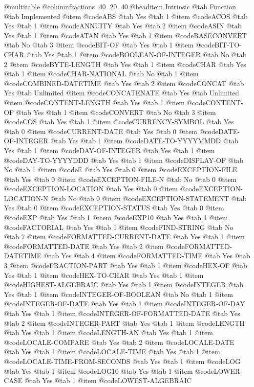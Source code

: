 @multitable @columnfractions .40 .20 .40
@headitem Intrinsic
@tab Function @tab Implemented
@item @code{ABS}
@tab Yes @tab 1
@item @code{ACOS}
@tab Yes @tab 1
@item @code{ANNUITY}
@tab Yes @tab 2
@item @code{ASIN}
@tab Yes @tab 1
@item @code{ATAN}
@tab Yes @tab 1
@item @code{BASECONVERT}
@tab No @tab 3
@item @code{BIT-OF}
@tab Yes @tab 1
@item @code{BIT-TO-CHAR}
@tab Yes @tab 1
@item @code{BOOLEAN-OF-INTEGER}
@tab No @tab 2
@item @code{BYTE-LENGTH}
@tab Yes @tab 1
@item @code{CHAR}
@tab Yes @tab 1
@item @code{CHAR-NATIONAL}
@tab No @tab 1
@item @code{COMBINED-DATETIME}
@tab Yes @tab 2
@item @code{CONCAT}
@tab Yes @tab Unlimited
@item @code{CONCATENATE}
@tab Yes @tab Unlimited
@item @code{CONTENT-LENGTH}
@tab Yes @tab 1
@item @code{CONTENT-OF}
@tab Yes @tab 1
@item @code{CONVERT}
@tab No @tab 3
@item @code{COS}
@tab Yes @tab 1
@item @code{CURRENCY-SYMBOL}
@tab Yes @tab 0
@item @code{CURRENT-DATE}
@tab Yes @tab 0
@item @code{DATE-OF-INTEGER}
@tab Yes @tab 1
@item @code{DATE-TO-YYYYMMDD}
@tab Yes @tab 1
@item @code{DAY-OF-INTEGER}
@tab Yes @tab 1
@item @code{DAY-TO-YYYYDDD}
@tab Yes @tab 1
@item @code{DISPLAY-OF}
@tab No @tab 1
@item @code{E}
@tab Yes @tab 0
@item @code{EXCEPTION-FILE}
@tab Yes @tab 0
@item @code{EXCEPTION-FILE-N}
@tab No @tab 0
@item @code{EXCEPTION-LOCATION}
@tab Yes @tab 0
@item @code{EXCEPTION-LOCATION-N}
@tab No @tab 0
@item @code{EXCEPTION-STATEMENT}
@tab Yes @tab 0
@item @code{EXCEPTION-STATUS}
@tab Yes @tab 0
@item @code{EXP}
@tab Yes @tab 1
@item @code{EXP10}
@tab Yes @tab 1
@item @code{FACTORIAL}
@tab Yes @tab 1
@item @code{FIND-STRING}
@tab No @tab 7
@item @code{FORMATTED-CURRENT-DATE}
@tab Yes @tab 1
@item @code{FORMATTED-DATE}
@tab Yes @tab 2
@item @code{FORMATTED-DATETIME}
@tab Yes @tab 4
@item @code{FORMATTED-TIME}
@tab Yes @tab 3
@item @code{FRACTION-PART}
@tab Yes @tab 1
@item @code{HEX-OF}
@tab Yes @tab 1
@item @code{HEX-TO-CHAR}
@tab Yes @tab 1
@item @code{HIGHEST-ALGEBRAIC}
@tab Yes @tab 1
@item @code{INTEGER}
@tab Yes @tab 1
@item @code{INTEGER-OF-BOOLEAN}
@tab No @tab 1
@item @code{INTEGER-OF-DATE}
@tab Yes @tab 1
@item @code{INTEGER-OF-DAY}
@tab Yes @tab 1
@item @code{INTEGER-OF-FORMATTED-DATE}
@tab Yes @tab 2
@item @code{INTEGER-PART}
@tab Yes @tab 1
@item @code{LENGTH}
@tab Yes @tab 1
@item @code{LENGTH-AN}
@tab Yes @tab 1
@item @code{LOCALE-COMPARE}
@tab Yes @tab 2
@item @code{LOCALE-DATE}
@tab Yes @tab 1
@item @code{LOCALE-TIME}
@tab Yes @tab 1
@item @code{LOCALE-TIME-FROM-SECONDS}
@tab Yes @tab 1
@item @code{LOG}
@tab Yes @tab 1
@item @code{LOG10}
@tab Yes @tab 1
@item @code{LOWER-CASE}
@tab Yes @tab 1
@item @code{LOWEST-ALGEBRAIC}
